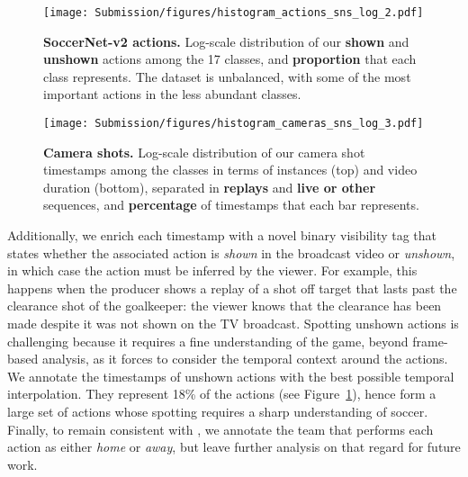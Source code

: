 \documentclass[final]{cvsports}
\begin{document}
\begin{figure}
    \centering
    \texttt{[image: Submission/figures/histogram\_actions\_sns\_log\_2.pdf]}
    \caption{\textbf{SoccerNet-v2 actions.} Log-scale distribution of our \textcolor{newjacobblue}{\textbf{shown}} and \textcolor{newjacoborange}{\textbf{unshown}} actions among the 17 classes, and \textcolor{newanthogray}{\textbf{proportion}} that each class represents. The dataset is unbalanced, with some of the most important actions in the less abundant classes.
    }
    \label{fig:all-histos1}
\end{figure}



\begin{figure}
    \centering
    \texttt{[image: Submission/figures/histogram\_cameras\_sns\_log\_3.pdf]}
\caption{
    \textbf{Camera shots.} Log-scale distribution of our camera shot timestamps among the classes in terms of instances (top) and video duration (bottom), separated in \textcolor{newjacoborange}{\textbf{replays}} and \textcolor{newjacobblue}{\textbf{live or other}} sequences, and \textcolor{newanthogray}{\textbf{percentage}} of timestamps that each bar represents.
    }
\label{fig:all-histos2}
\end{figure}

Additionally, we enrich each timestamp with a novel binary visibility tag that states whether the associated action is \emph{shown} in the broadcast video or \emph{unshown}, in which case the action must be inferred by the viewer. For example, this happens when the producer shows a replay of a shot off target that lasts past the clearance shot of the goalkeeper: the viewer knows that the clearance has been made despite it was not shown on the TV broadcast. Spotting unshown actions is challenging because it requires a fine understanding of the game, beyond frame-based analysis, as it forces to consider the temporal context around the actions. 
We annotate the timestamps of unshown actions with the best possible temporal interpolation. They represent 18\% of the actions (see Figure~\ref{fig:all-histos1}), hence form a large set of actions whose spotting requires a sharp understanding of soccer.
Finally, to remain consistent with \SoccerNet, we annotate the team that performs each action as either \emph{home} or \emph{away}, but leave further analysis on that regard for future work.
\end{document}
